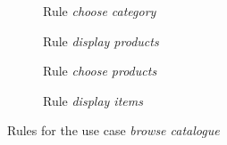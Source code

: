 \begin{example}
\begin{figure}[!ht]
  \centering
  \begin{subfigure}[t]{.5\textwidth}
    \centerline{}
    \caption{Rule \emph{choose category}}
  \end{subfigure}
  \begin{subfigure}[t]{.5\textwidth}
    \centerline{}
    \caption{Rule \emph{display products}}
  \end{subfigure}
  \begin{subfigure}[t]{.5\textwidth}
    \centerline{}
    \caption{Rule \emph{choose products}}
  \end{subfigure}
  \begin{subfigure}[t]{.5\textwidth}
    \centerline{}
    \caption{Rule \emph{display items}}
  \end{subfigure}
  \caption{Rules for the use case \emph{browse catalogue}}\label{fig:tests:grammar}
\end{figure}


\end{example}
